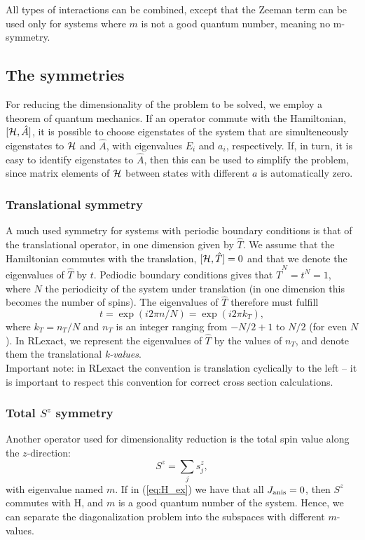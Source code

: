 \documentclass{article}
\begin{document}
All types of interactions can be combined, except that the Zeeman term can be used only for systems where $m$ is not a good quantum number, meaning no m-symmetry.

\subsection{The symmetries}
For reducing the dimensionality of the problem to be solved, we employ a theorem of quantum mechanics. If an operator commute with the Hamiltonian, $[{\cal H}, \hat{A}]$, it is possible to choose eigenstates of the system that are simulteneously eigenstates to ${\cal H}$ and $\hat{A}$, with eigenvalues $E_i$ and $a_i$, respectively. 
If, in turn, it is easy to identify eigenstates to $\hat{A}$, then this can be used to simplify the problem, since matrix elements of ${\cal H}$ between states with different $a$ is automatically zero.

\subsubsection{Translational symmetry}
A much used symmetry for systems with periodic boundary conditions is that of the translational operator, 
in one dimension given by $\hat{T}$. We assume that the Hamiltonian commutes with the translation, $[{\cal H},\hat{T}] = 0$
and that we denote the eigenvalues of $\hat{T}$ by $t$. Pediodic boundary conditions gives that $\hat{T}^N = t^N = 1$, where $N$
the periodicity of the system under translation (in one dimension this becomes the number of spins). The eigenvalues of $\hat{T}$
therefore must fulfill
\begin{equation}
t = \exp (i 2 \pi n/N) = \exp (i 2 \pi k_T) ,
\end{equation}
where $k_T = n_T/N$ and $n_T$ is an integer ranging from $-N/2+1$ to $N/2$ (for even $N$). In RLexact, we represent the eigenvalues
of $\hat{T}$ by the values of $n_T$, and denote them the translational {\em k-values}.\\
Important note: in RLexact the convention is translation cyclically to the left -- it is important to respect this convention for correct cross section calculations.

\subsubsection{Total $S^z$ symmetry}
Another operator used for dimensionality reduction is the total spin value along the $z$-direction:
\begin{equation}
S^z = \sum_j s_j^z ,
\end{equation}
with eigenvalue named $m$. If in (\ref{eq:H_ex}) we have that all $J_{\rm anis} = 0$, then $S^z$ commutes with {\cal H}, 
and $m$ is a good quantum number of the system. Hence, we can separate the diagonalization problem into the subspaces with different $m$-values.\\
\end{document}
